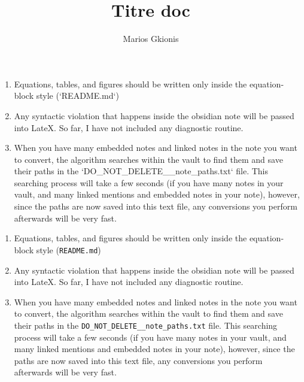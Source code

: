 \documentclass{extarticle}
\begin{document}
\allowdisplaybreaks
\date{}
\author{Marios Gkionis}
\title{Titre doc}
\maketitle


\begin{enumerate}

\item Equations, tables, and figures should be written only inside the equation-block style (`README.md`)

\item Any syntactic violation that happens inside the obsidian note will be passed into LateX. So far, I have not included any diagnostic routine.

\item When you have many embedded notes and linked notes in the note you want to convert, the algorithm searches within the vault to find them and save their paths in the `DO_NOT_DELETE__note_paths.txt` file. This searching process will take a few seconds (if you have many notes in your vault, and many linked mentions and embedded notes in your note), however, since the paths are now saved into this text file, any conversions you perform afterwards will be very fast.

\end{enumerate}

\tableofcontents
\newpage





\begin{enumerate}

\item Equations, tables, and figures should be written only inside the equation-block style (\texttt{README.md})

\item Any syntactic violation that happens inside the obsidian note will be passed into LateX. So far, I have not included any diagnostic routine.

\item When you have many embedded notes and linked notes in the note you want to convert, the algorithm searches within the vault to find them and save their paths in the \texttt{DO\_NOT\_DELETE\_\_note\_paths.txt} file. This searching process will take a few seconds (if you have many notes in your vault, and many linked mentions and embedded notes in your note), however, since the paths are now saved into this text file, any conversions you perform afterwards will be very fast.

\end{enumerate}
\end{document}
